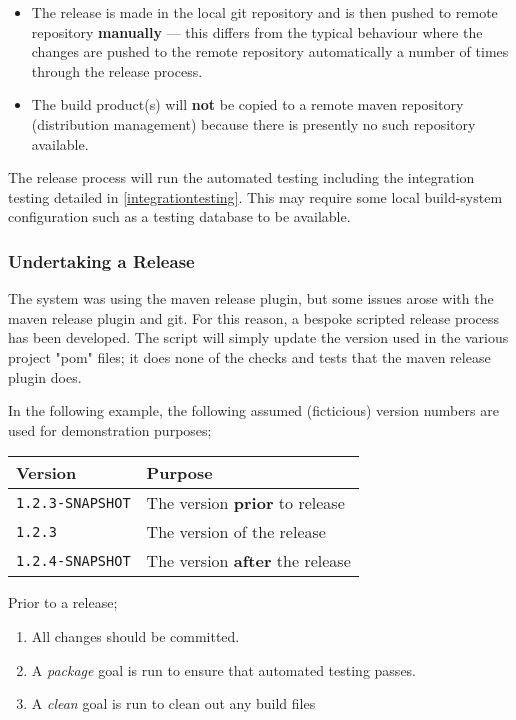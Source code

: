 \begin{itemize}
\item The release is made in the local git repository and is then pushed to remote repository {\bf manually} --- this differs from the typical behaviour where the changes are pushed to the remote repository automatically a number of times through the release process.
\item The build product(s) will {\bf not} be copied to a remote maven repository (distribution management) because there is presently no such repository available.
\end{itemize}

The release process will run the automated testing including the integration testing detailed in \ref{integrationtesting}.  This may require some local build-system configuration such as a testing database to be available.

\subsubsection{Undertaking a Release}

The system was using the maven release plugin, but some issues arose with the maven release plugin and git.  For this reason, a bespoke scripted release process has been developed.  The script will simply update the version used in the various project "pom" files; it does none of the checks and tests that the maven release plugin does.

In the following example, the following assumed (ficticious) version numbers are used for demonstration purposes;

\begin{tabular}{ | l | l | }
\hline
Version & Purpose \\
\hline
{\tt 1.2.3-SNAPSHOT} & The version {\bf prior} to release \\
{\tt 1.2.3} & The version of the release  \\
{\tt 1.2.4-SNAPSHOT} & The version {\bf after} the release \\
\hline
\end{tabular}

Prior to a release;

\begin{enumerate}
\item All changes should be committed.
\item A {\it package} goal is run to ensure that automated testing passes.
\item A {\it clean} goal is run to clean out any build files
\end{enumerate}

